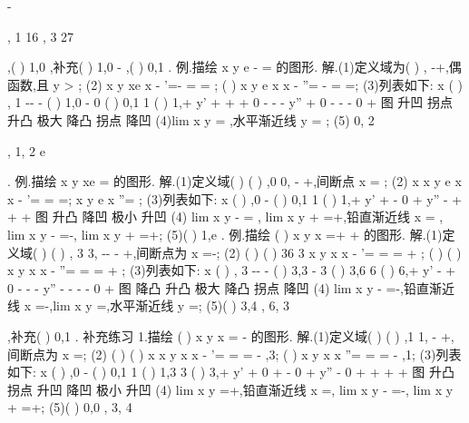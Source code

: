 -




, 1 16
,
3 27






,(
)
1,0 ,补充(
)
1,0
-
,(
)
0,1 . 
\textcolor{lyred}{例}.描绘
x
y
e
\pi 
-
=
的图形. 
解.(1)定义域为(
)
,
-\infty +\infty ,偶函数,且
y >
; 
(2)
x
y
xe
x
\pi 
-
'=-
=
\Rightarrow 
=
;
(
)
x
y
e
x
x
\pi 
-
''=
-
=
\Rightarrow 
=\pm ; 
(3)列表如下: 
x     (
)
, 1
-\infty -
-    (
)
1,0
-
     0     (
)
0,1     1    (
)
1,+\infty  
y'       +       +       +       0      -      -      - 
y''       +       0       -       -      -      0      + 
图      升凹     拐点     升凸    极大    降凸    拐点    降凹 
(4)lim
x
y
\to \infty 
=
,水平渐近线
y =
; 
(5)
0,
2\pi 






,
1,
2 e
\pi 


\pm 




. 
\textcolor{lyred}{例}.描绘
x
y
xe
=
的图形. 
解.(1)定义域(
)
(
)
,0
0,
-\infty 
\cup 
+\infty ,间断点
x =
; 
(2)
x
x
y
e
x
x
-
'=
=
\Rightarrow 
=;
x
y
e
x
''=
; 
(3)列表如下: 
x        (
)
,0
-      (
)
0,1      1      (
)
1,+\infty  
y'          +        \times        -        0        + 
y''          -        \times        +        +       + 
图         升凸       \times       降凹      极小     升凹 
(4)
lim
x
y
-
\to 
=
,
lim
x
y
+
\to 
=+\infty ,铅直渐近线
x =
, lim
x
y
\to -\infty 
=-\infty , lim
x
y
\to +\infty 
=+\infty ; 
(5)(
)
1,e . 
\textcolor{lyred}{例}.描绘
(
)
x
y
x
=+
+
的图形. 
解.(1)定义域(
)
(
)
, 3
3,
-\infty -
\cup -
+\infty ,间断点为
x =-; 
(2)
(
)
(
)
36 3
x
y
x
x
-
'=
=
\Rightarrow 
=
+
;
(
)
(
)
x
y
x
x
-
''=
=
\Rightarrow 
=
+
; 
(3)列表如下: 
x     (
)
, 3
-\infty -
-    (
)
3,3
-
    3     (
)
3,6     6     (
)
6,+\infty  
y'        -       \times       +      0       -      -       - 
y''        -       \times       -      -       -      0       + 
图       降凸      \times      升凸    极大    降凸    拐点     降凹 
(4)
lim
x
y
\to -
=-\infty ,铅直渐近线
x =-,lim
x
y
\to \infty 
=,水平渐近线
y =; 
(5)(
)
3,4 ,
6, 3






,补充(
)
0,1 . 
\textcolor{lyred}{补充练习 }
1.描绘
(
)
x
y
x
=
-
的图形. 
解.(1)定义域(
)
(
)
,1
1,
-\infty 
\cup 
+\infty ,间断点为
x =; 
(2)
(
)
(
)
x
x
y
x
x
-
'=
=
\Rightarrow 
=
-
,3;
(
)
x
y
x
x
''=
=
\Rightarrow 
=
-
,1; 
(3)列表如下: 
x     (
)
,0
-     (
)
0,1    1     (
)
1,3     3     (
)
3,+\infty  
y'       +       0      +      \times       -      0       + 
y''       -       0      +      \times       +      +       + 
图      升凸     拐点    升凹     \times      降凹    极小    升凹 
(4)
lim
x
y
\to 
=+\infty ,铅直渐近线
x =, lim
x
y
\to -\infty 
=-\infty , lim
x
y
\to +\infty 
=+\infty ; 
(5)(
)
0,0 ,
3, 4






